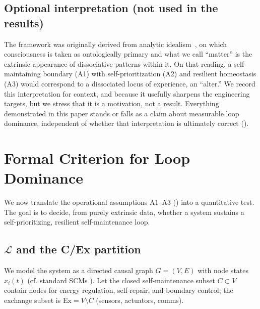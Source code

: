 \documentclass[11pt]{article}
\begin{document}
\subsection{Optional interpretation (not used in the results)}
\label{sec:optional_interpretation}

The framework was originally derived from analytic idealism~\cite{kastrup2017ontological}, on which consciousness is taken as ontologically primary and what we call ``matter'' is the extrinsic appearance of dissociative patterns within it. On that reading, a self-maintaining boundary (A1) with self-prioritization (A2) and resilient homeostasis (A3) would correspond to a dissociated locus of experience, an ``alter.'' We record this interpretation for context, and because it usefully sharpens the engineering targets, but we stress that it is a motivation, not a result. Everything demonstrated in this paper stands or falls as a claim about measurable loop dominance, independent of whether that interpretation is ultimately correct ().

\section{Formal Criterion for Loop Dominance}
\label{sec:criterion}
We now translate the operational assumptions A1--A3 () into a quantitative test. The goal is to decide, from purely extrinsic data, whether a system sustains a self-prioritizing, resilient self-maintenance loop.

\subsection{$\mathcal{L}$ and the C/Ex partition}
\label{sec:l_partition}

We model the system as a directed causal graph $G = (V, E)$ with node states $x_i(t)$ (cf. standard SCMs \cite{pearl2009causality}). Let the closed self-maintenance subset $C \subset V$ contain nodes for energy regulation, self-repair, and boundary control; the exchange subset is $\text{Ex} = V \setminus C$ (sensors, actuators, comms).
\end{document}

